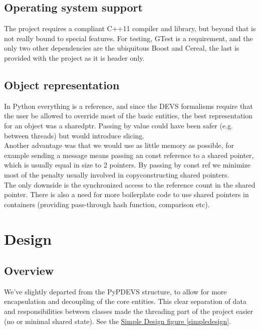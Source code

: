 \documentclass[8pt,a4paper]{report}
\begin{document}
\section{Operating system support}
The project requires a compliant C++11 compiler and library, but beyond that is not really bound to special features. For testing, GTest is a requirement, and the only two other dependencies are the ubiquitous Boost and Cereal, the last is provided with the project as it is header only.

\section{Object representation}
In Python everything is a reference, and since the DEVS formalisms require that the user be allowed to override most of the basic entities, the best representation for an object was a shared\textunderscore ptr. Passing by value could have been safer (e.g. between threads) but would introduce slicing.\\ Another advantage was that we would use as little memory as possible, for example sending a message means passing an const reference to a shared pointer, which is usually equal in size to 2 pointers. By passing by const ref we minimize most of the penalty usually involved in copyconstructing shared pointers. \\
The only downside is the synchronized access to the reference count in the shared pointer. There is also a need for more boilerplate code to use shared pointers in containers (providing pass-through hash function, comparison etc). 

\chapter{Design}
\section{Overview}
We've slightly departed from the PyPDEVS structure, to allow for more encapsulation and decoupling of the core entities. This clear separation of data and responsibilities between classes made the threading part of the project easier (no or minimal shared state). See the \hyperref[simpledesign]{Simple Design figure \ref*{simpledesign}}.\\
\end{document}
